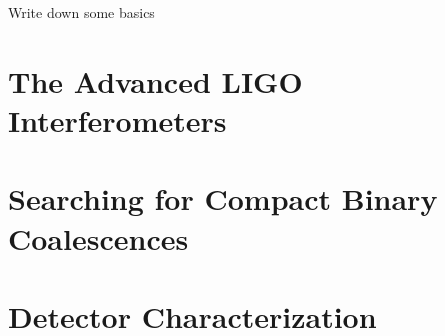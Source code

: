 Write down some basics

\section{The Advanced LIGO Interferometers}

\section{Searching for Compact Binary Coalescences}

\section{Detector Characterization}
